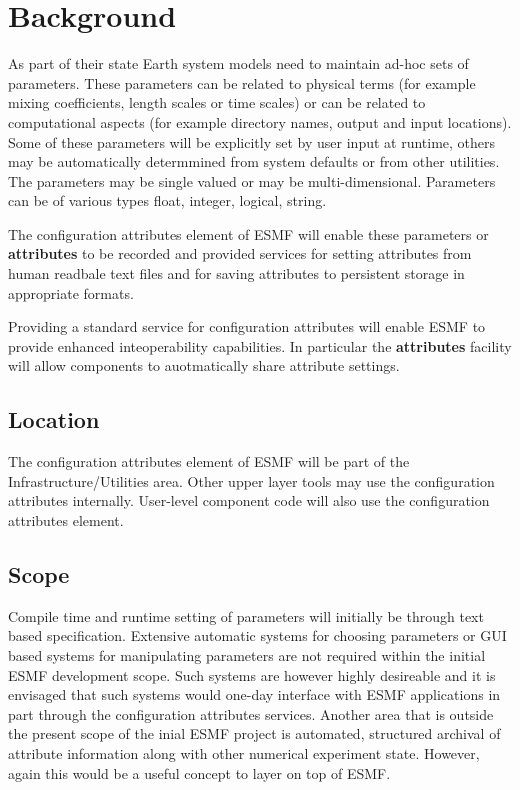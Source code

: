 
\section{Background}
As part of their state Earth system models need to maintain ad-hoc sets of
parameters. These parameters can be related to physical terms (for example
mixing coefficients, length scales or time scales) or can be related
to computational aspects (for example directory names, output and input
locations). Some of these parameters will be explicitly set by user
input at runtime, others may be automatically determmined from system
defaults or from other utilities. The parameters may be single valued
or may be multi-dimensional. Parameters can be of various types float,
integer, logical, string.

The configuration attributes element of ESMF will enable
these parameters or {\bf attributes} to be recorded and provided services
for setting attributes from human readbale text files and for saving attributes
to persistent storage in appropriate formats.

Providing a standard service for configuration attributes will enable ESMF
to provide enhanced inteoperability capabilities. In particular the
{\bf attributes} facility will allow components to auotmatically
share attribute settings.

\subsection{Location}

The configuration attributes element of ESMF will be part of the
Infrastructure/Utilities area. Other upper layer tools may use the
configuration attributes internally. User-level component code will
also use the configuration attributes element.

\subsection{Scope}

Compile time and runtime setting of parameters will initially be through
text based specification. Extensive automatic systems for choosing parameters or GUI
based systems for manipulating parameters are not required within the 
initial ESMF development scope. Such systems are however highly desireable
and it is envisaged that such systems would one-day interface with ESMF applications
in part through the configuration attributes services.
Another area that is outside the present scope of the inial ESMF project is automated,
structured archival of attribute information along with other numerical
experiment state. However, again this would be a useful concept to layer on
top of ESMF.


